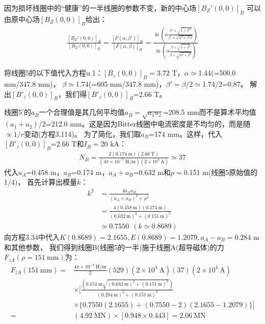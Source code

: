 因为损坏线圈中的“健康”的一半线圈的参数不变，新的中心场$[B_Z'(0,0)]_B$
可以由原中心场$[B_Z(0,0)]_B$给出：
\begin{align*}%
\frac{[B_Z'(0,0)]_B}{[B_Z(0,0)]_B}
=\frac{[F(\alpha,\beta')]_B}{[F(\alpha,\beta)]_B}
=\frac{\ln(\alpha\frac{\beta'+\sqrt{1+\beta'^2}}{\beta'+\sqrt{\alpha^2+\beta'2}})}{\ln(\alpha\frac{\beta+\sqrt{1+\beta^2}}{\beta+\sqrt{\alpha^2+\beta^2}})} \tag{u.1}
\end{align*}

将线圈5的以下值代入方程u.1：$[B_z(0,0)]_B=3.72$ T，$\alpha\simeq$1.44(=500.0 mm/347.8 mm)，
$\beta\simeq$1.74(=605 mm/347.8 mm)，$\beta'=\beta/2\simeq$1.74/2=0.87。
解出$[B'_z(0,0)]_B$，我们得$[B'_z(0,0)]_B$=2.66 T。

线圈5'的$a_B$一个合理值是其几何平均值$a_B=\sqrt{a_1 a_2}$=208.5 mm而不是算术平均值
$(a_1+a_2)/2$=212.0 mm。这是因为Bitter线圈中电流密度是不均匀的，而是随$\propto 1/r$变动(方程3.114)。
为了简化，我们取$a_B$=174 mm。这样，代入$[B'_z(0,0)]_B$=2.66 T和$I_B=$20 kA：
\begin{align*}%
N_B=\frac{2(0.174\ \mathrm{m})(2.66\ \mathrm{T})}{(4\pi\times 10^{-7}\ \mathrm{H/m})(2\times 10^4\ \mathrm{A})}\simeq 37
\end{align*}
代入$a_A$=0.458 m，$a_B$=0.174 m，$a_A+a_B$=0.632 m和$\rho=$0.151 m(线圈5原始值的1/4)，
首先计算出模量$k$：
\begin{align*}%
k^2&=\frac{4a_Aa_B}{(a_A+a_B)^2+\rho^2}\\ \tag{3.36}
&=\frac{4(0.458\ \mathrm{m})(0.174\ \mathrm{m})}{(0.632\ \mathrm{m})^2+(0.151\ \mathrm{m})^2}\\
&\simeq 0.7550\ \ (k\simeq 0.8689)
\end{align*}
向方程3.34中代入$K(0.8689)=2.1655, E(0.8689)=1.2079, a_A-a_B=0.284$ m和其他参数，
我们得到线圈B(线圈5的一半)施于线圈A(超导磁体)的力$F_{zA}(\rho=151\ \mathrm{mm})$为：
\begin{align*}%
F_{zA}(151\ \mathrm{mm})=&\frac{4\pi\times10^{-7}\ \mathrm{H/m}}{2}(529)(2\times 10^4\ \mathrm{A})(37)(2\times 10^4\ \mathrm{A})\\
&\times[\frac{(0.151\ \mathrm{m}\sqrt{(0.632\ \mathrm{m})^2+(0.151 \ \mathrm{m})^2})}{(0.284\ \mathrm{m})^2+(0.151\ \mathrm{m})^2}\\
&\times\{0.7550(2.1655)+(0.7550-2)(2.1655-1.2079)\}]\\
=&(4.92\ \mathrm{MN})\times[0.948\times 0.443]=2.06\ \mathrm{MN}
\end{align*}

